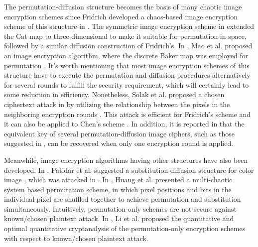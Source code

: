 \documentclass[3p,preprint,11pt]{elsarticle}
\begin{document}
The permutation-diffusion structure becomes the basis of many chaotic image encryption schemes
since Fridrich developed a chaos-based image encryption scheme of this structure in 
\cite{Fridrich:ChaoticImageEncryption:IJBC98}.
The symmetric image encryption scheme in \cite{Chen:3DChaoticCipher:CSF04} extended the Cat map to
three-dimensional to make it suitable for permutation in space, followed by a similar diffusion construction of Fridrich's.
In , Mao et al. proposed an image encryption algorithm, where the discrete Baker map was
employed for permutation \cite{Mao:3Dbakermap:Optic2009}.  It's worth mentioning that most image encryption
schemes of this structure have to execute the permutation and diffusion procedures alternatively for several
rounds to fulfill the security requirement, which will certainly lead to some reduction in efficiency.
Nonetheless, Solak et al. proposed a chosen ciphertext attack in  by utilizing the relationship between
the pixels in the neighboring encryption rounds \cite{Solak:AnalyFridrich:IJBC10}.
This attack is efficient for Fridrich's scheme \cite{Fridrich:ChaoticImageEncryption:IJBC98}
and it can also be applied to Chen's scheme \cite{Chen:3DChaoticCipher:CSF04}.
In addition, it is reported in \cite{Chengqing:AnalysisFridrichstructure:IEEECirSys08} that the equivalent
key of several permutation-diffusion image ciphers, such as
those suggested in \cite{Fridrich:ChaoticImageEncryption:IJBC98,Chen:3DChaoticCipher:CSF04,
Mao:3Dbakermap:Optic2009,he:colorfridrichstruture:LNCS06},
can be recovered when only one encryption round is applied.


Meanwhile, image encryption algorithms having other structures have also been developed.
In , Patidar et al. suggested a substitution-diffusion structure for color image
\cite{Pareek:subdiffusion:CNSNS10}, which was attacked in \cite{chengqing:breakingPareek:CNSNS11}.
In \cite{Huang:pixelShuffle:Optic2009}, Huang et al. presented a multi-chaotic system based
permutation scheme, in which pixel positions and bits in
the individual pixel are shuffled together to achieve permutation and substitution simultaneously.
Intuitively, permutation-only schemes are not secure against known/chosen plaintext attack. In \cite{Chengqing:OptimalofPermutation:SG11,Shujun:quantitativePermutation:SGIC08},
Li et al. proposed the quantitative and optimal quantitative cryptanalysis of the permutation-only encryption
schemes with respect to known/chosen plaintext attack.
\end{document}
